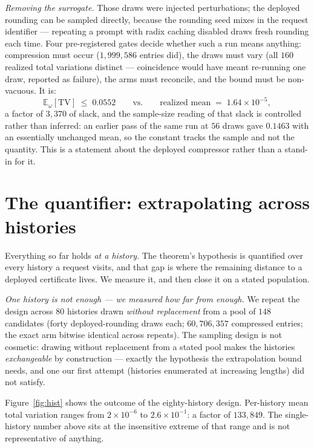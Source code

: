 \documentclass[11pt]{article}
\renewcommand{\_}{\WCorigunderscore\allowbreak}
\begin{document}
\emph{Removing the surrogate.} Those draws were injected perturbations;
the deployed rounding can be sampled directly, because the rounding seed
mixes in the request identifier --- repeating a prompt with radix
caching disabled draws fresh rounding each time. Four pre-registered
gates decide whether such a run means anything: compression must occur
($1{,}999{,}586$ entries did), the draws must vary (all $160$ realized
total variations distinct --- coincidence would have meant re-running
one draw, reported as failure), the arms must reconcile, and the bound
must be non-vacuous. It is:
\begin{equation}
\mathbb{E}_\omega[\mathrm{TV}]\;\le\;0.0552
\qquad\text{vs.}\qquad
\text{realized mean}\;=\;1.64\times10^{-5},
\label{eq:nonvacuous}
\end{equation}
a factor of $3{,}370$ of slack, and the sample-size reading of that
slack is controlled rather than inferred: an earlier pass of the same run at $56$ draws gave
$0.1463$ with an essentially unchanged mean, so the constant tracks the
sample and not the quantity. This is a statement about the deployed
compressor rather than a stand-in for it.

\section{The quantifier: extrapolating across histories}
\label{sec:quantifier}
Everything so far holds \emph{at a history}. The theorem's hypothesis is
quantified over every history a request visits, and that gap is where the
remaining distance to a deployed certificate lives. We measure it, and
then close it on a stated population.

\emph{One history is not enough --- we measured how far from enough.} We repeat the design across $80$ histories drawn
\emph{without replacement} from a pool of $148$ candidates (forty
deployed-rounding draws each; $60{,}706{,}357$ compressed entries; the
exact arm bitwise identical across repeats). The sampling design is not
cosmetic: drawing without replacement from a stated pool makes the
histories \emph{exchangeable} by construction --- exactly the
hypothesis the extrapolation bound needs, and one our first attempt
(histories enumerated at increasing lengths) did not satisfy.

Figure~\ref{fig:hist} shows the outcome of the eighty-history design.
Per-history mean total variation ranges from $2\times10^{-6}$ to
$2.6\times10^{-1}$: a factor of $133{,}849$. The single-history number
above sits at the insensitive extreme of that range and is not
representative of anything.
\end{document}

